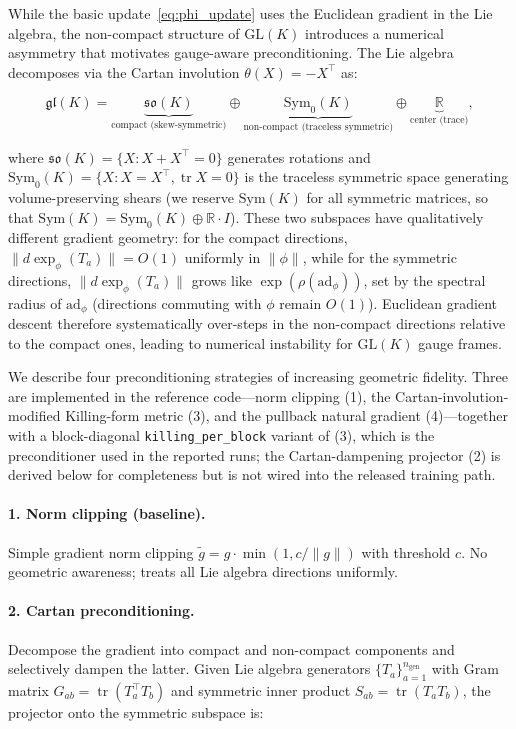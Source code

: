 \documentclass[twoside,11pt]{article}
\begin{document}
While the basic update~\eqref{eq:phi_update} uses the Euclidean gradient in the Lie algebra, the non-compact structure of $\mathrm{GL}(K)$ introduces a numerical asymmetry that motivates gauge-aware preconditioning. The Lie algebra decomposes via the Cartan involution $\theta(X) = -X^\top$ as:

\begin{equation}
\mathfrak{gl}(K) = \underbrace{\mathfrak{so}(K)}_{\text{compact (skew-symmetric)}} \oplus \underbrace{\mathrm{Sym}_0(K)}_{\text{non-compact (traceless symmetric)}} \oplus \underbrace{\mathbb{R}}_{\text{center (trace)}},
\label{eq:cartan_decomposition}
\end{equation}

where $\mathfrak{so}(K) = \{X : X + X^\top = 0\}$ generates rotations and $\mathrm{Sym}_0(K) = \{X : X = X^\top, \operatorname{tr} X = 0\}$ is the traceless symmetric space generating volume-preserving shears (we reserve $\mathrm{Sym}(K)$ for all symmetric matrices, so that $\mathrm{Sym}(K) = \mathrm{Sym}_0(K) \oplus \mathbb{R}\cdot I$). These two subspaces have qualitatively different gradient geometry: for the compact directions, $\|d\exp_\phi(T_a)\| = O(1)$ uniformly in $\|\phi\|$, while for the symmetric directions, $\|d\exp_\phi(T_a)\|$ grows like $\exp(\rho(\mathrm{ad}_\phi))$, set by the spectral radius of $\mathrm{ad}_\phi$ (directions commuting with $\phi$ remain $O(1)$). Euclidean gradient descent therefore systematically over-steps in the non-compact directions relative to the compact ones, leading to numerical instability for $\mathrm{GL}(K)$ gauge frames.

We describe four preconditioning strategies of increasing geometric fidelity. Three are implemented in the reference code---norm clipping (1), the Cartan-involution-modified Killing-form metric (3), and the pullback natural gradient (4)---together with a block-diagonal \texttt{killing\_per\_block} variant of (3), which is the preconditioner used in the reported runs; the Cartan-dampening projector (2) is derived below for completeness but is not wired into the released training path.

\paragraph{1. Norm clipping (baseline).}
Simple gradient norm clipping $\tilde{g} = g \cdot \min(1, c/\|g\|)$ with threshold $c$. No geometric awareness; treats all Lie algebra directions uniformly.

\paragraph{2. Cartan preconditioning.}
Decompose the gradient into compact and non-compact components and selectively dampen the latter. Given Lie algebra generators $\{T_a\}_{a=1}^{n_{\mathrm{gen}}}$ with Gram matrix $G_{ab} = \operatorname{tr}(T_a^\top T_b)$ and symmetric inner product $S_{ab} = \operatorname{tr}(T_a T_b)$, the projector onto the symmetric subspace is:
\end{document}
